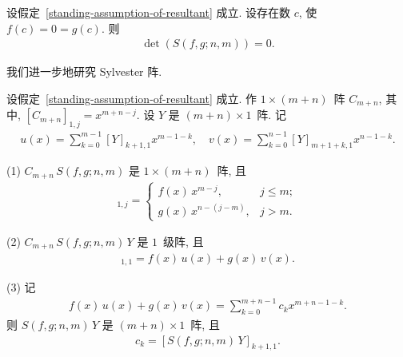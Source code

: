 \documentclass[../libro.tex]{subfiles}
\begin{document}
\begin{theorem}\label{thm:necessary-condition-for-the-existence-of-a-common-root}
    设假定~\ref{standing-assumption-of-resultant} 成立.
    设存在数 \(c\), 使 \(f(c) = 0 = g(c)\).
    则
    \begin{align*}
        \det {(S(f, g; n, m))} = 0.
    \end{align*}
\end{theorem}

我们进一步地研究 Sylvester 阵.

\begin{theorem}
    设假定~\ref{standing-assumption-of-resultant} 成立.
    作 \(1 \times (m+n)\)~阵 \(C_{m+n}\),
    其中, \([C_{m+n}]_{1,j} = x^{m+n-j}\).
    设 \(Y\) 是 \((m+n) \times 1\)~阵.
    记
    \begin{align*}
        u(x) = \sum_{k = 0}^{m-1} {[Y]_{k+1,1} x^{m-1-k}},
        \quad
        v(x) = \sum_{k = 0}^{n-1} {[Y]_{m+1+k,1} x^{n-1-k}}.
    \end{align*}

    (1)
    \(C_{m+n}\, S(f, g; n, m)\) 是 \(1 \times (m + n)\)~阵,
    且
    \begin{align*}
        [C_{m+n}\, S(f, g; n, m)]_{1,j} =
        \begin{cases}
            f(x)\, x^{m-j},     & j \leq m; \\
            g(x)\, x^{n-(j-m)}, & j > m.
        \end{cases}
    \end{align*}

    (2)
    \(C_{m+n}\, S(f, g; n, m)\, Y\) 是 \(1\)~级阵, 且
    \begin{align*}
        [C_{m+n}\, S(f, g; n, m)\, Y]_{1,1} = f(x)\, u(x) + g(x)\, v(x).
    \end{align*}

    (3)
    记
    \begin{align*}
        f(x)\, u(x) + g(x)\, v(x) = \sum_{k = 0}^{m+n-1} {c_k x^{m+n-1-k}}.
    \end{align*}
    则 \(S(f, g; n, m)\, Y\) 是 \((m+n) \times 1\)~阵, 且
    \begin{align*}
        c_k = [S(f, g; n, m)\, Y]_{k+1,1}.
    \end{align*}
\end{theorem}
\end{document}
